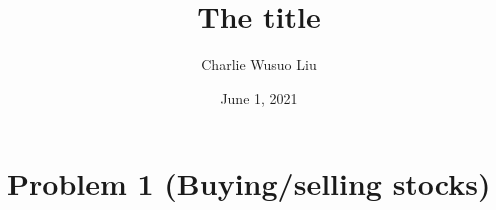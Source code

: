 \documentclass{article}
\begin{document}
\title{The title}
\author{Charlie Wusuo Liu}
\date{June 1, 2021}


	\maketitle
	\begin{abstract}
       
	\end{abstract}
	\tableofcontents	

\pagestyle{plain}


\section{Problem 1 (Buying/selling stocks)}




%
%
%
%
%
%
%	
%	
%	
%	
%	
%	
%
%
\end{document}
